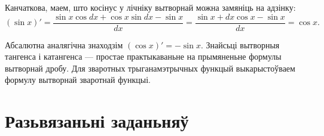 \documentclass[10pt,a4paper]{book}
\theoremstyle{plain}
\begin{document}
Канчаткова, маем, што косінус у лічніку вытворнай можна замяніць на адзінку:
\begin{equation*}
  (\sin x)' = \frac{\sin x \cos dx + \cos x \sin dx - \sin x}{dx} = \frac{\sin x
    + dx \cos x - \sin x}{dx} = \cos x.
\end{equation*}

Абсалютна аналягічна знаходзім $(\cos x)' = - \sin x$. Знайсьці вытворныя
тангенса і катангенса --- простае практыкаваньне на прымяненьне формулы
вытворнай дробу. Для зваротных трыганамэтрычных функцый выкарыстоўваем формулу
вытворнай зваротнай функцыі.

\chapter{Разьвязаньні заданьняў}

\end{document}
